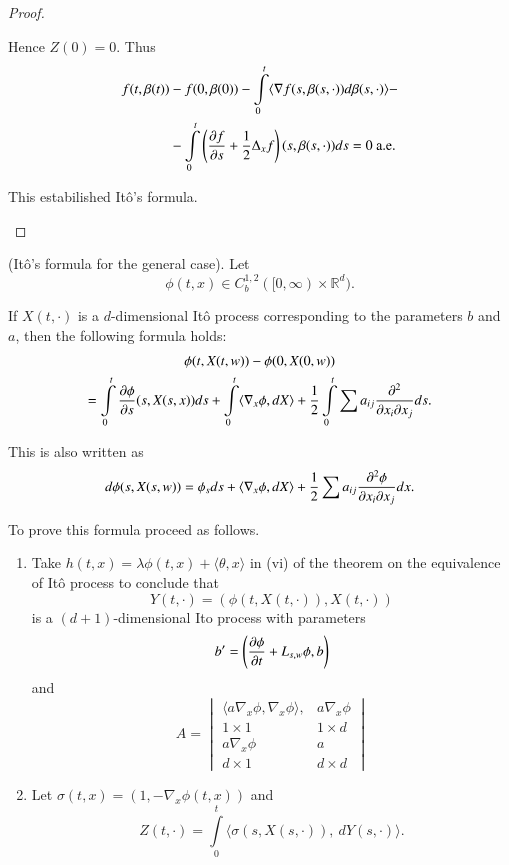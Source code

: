 \begin{proof}
\begin{step}
Hence $Z(0)=0$. Thus
\begin{align*}
f(t,\beta(t)) &- f(0,\beta(0))-\int\limits^{t}_{0}\langle \nabla
f(s,\beta(s,\cdot))d\beta(s,\cdot)\rangle-\\
&- \int\limits^{t}_{0}\left(\frac{\partial f}{\partial
  s}+\frac{1}{2}\Delta_{x}f\right)(s,\beta(s,\cdot))ds=0\text{~ a.e.}
\end{align*}

This estabilished It\^o's formula.
\end{step}
\end{proof}

\begin{exer*}
(It\^o's formula for the general case). Let
$$
\phi(t,x)\in C^{1,2}_{b}([0,\infty)\times \mathbb{R}^{d}).
$$

If $X(t,\cdot)$ is a $d$-dimensional It\^o process corresponding to
the parameters $b$ and $a$, then the following formula holds:
\begin{gather*}
\phi(t,X(t,w))-\phi(0,X(0,w))\\
=\int\limits^{t}_{0}\frac{\partial \phi}{\partial
  s}(s,X(s,x))ds+\int\limits^{t}_{0}\langle \nabla_{x}\phi, dX\rangle
+\frac{1}{2}\int\limits^{t}_{0}\sum a_{ij}\frac{\partial^{2}}{\partial x_{i}\partial x_{j}}ds.
\end{gather*}

This is also written as
$$
d\phi(s,X(s,w))=\phi_{s}ds+\langle \nabla_{x}\phi,dX\rangle
+\frac{1}{2}\sum a_{ij}\frac{\partial^{2}\phi}{\partial x_{i}\partial x_{j}}dx.
$$

To prove this formula proceed as follows.
\begin{enumerate}
\renewcommand{\theenumi}{\roman{enumi}}
\renewcommand{\labelenumi}{(\theenumi)}
\item Take $h(t,x)=\lambda\phi(t,x)+\langle \theta,x\rangle$ in (vi)
  of the theorem on the equivalence of It\^o process to conclude that
$$
Y(t,\cdot)=(\phi(t,X(t,\cdot)),X(t,\cdot))
$$
is a $(d+1)$-dimensional Ito process with parameters
$$
b'=\left(\frac{\partial\phi}{\partial t}+L_{s,w}\phi,b\right)
$$\pageoriginale
and
$$
A=
\begin{vmatrix}
\langle a\nabla_{x}\phi,\nabla_{x}\phi\rangle, & a\nabla_{x}\phi\\
1\times 1 & 1\times d\\
a\nabla_{x}\phi & a\\
d\times 1 & d\times d
\end{vmatrix}
$$

\item Let $\sigma(t,x)=(1,-\nabla_{x}\phi(t,x))$ and
$$
Z(t,\cdot)=\int\limits^{t}_{0}\langle
\sigma(s,X(s,\cdot)),\ dY(s,\cdot)\rangle. 
$$


\end{enumerate}
\end{exer*}
